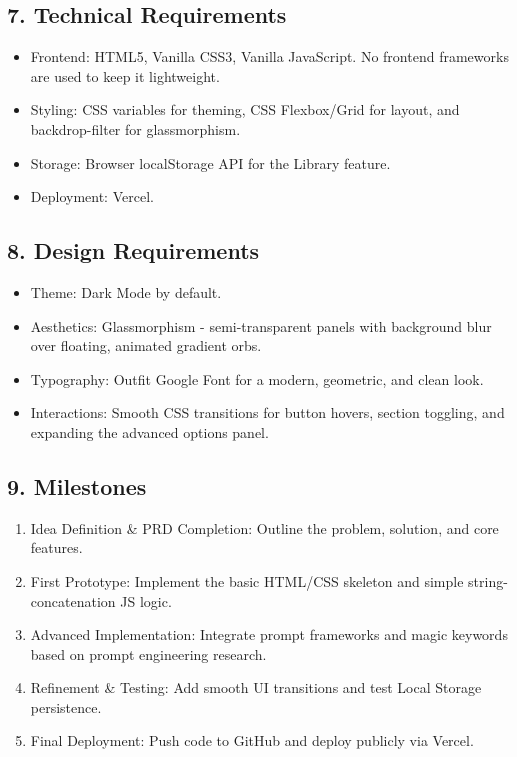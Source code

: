 \documentclass[11pt]{article}
\begin{document}
\subsection*{7. Technical Requirements}
\begin{itemize}[noitemsep]
    \item Frontend: HTML5, Vanilla CSS3, Vanilla JavaScript. No frontend frameworks are used to keep it lightweight.
    \item Styling: CSS variables for theming, CSS Flexbox/Grid for layout, and backdrop-filter for glassmorphism.
    \item Storage: Browser localStorage API for the Library feature.
    \item Deployment: Vercel.
\end{itemize}

\subsection*{8. Design Requirements}
\begin{itemize}[noitemsep]
    \item Theme: Dark Mode by default.
    \item Aesthetics: Glassmorphism - semi-transparent panels with background blur over floating, animated gradient orbs.
    \item Typography: Outfit Google Font for a modern, geometric, and clean look.
    \item Interactions: Smooth CSS transitions for button hovers, section toggling, and expanding the advanced options panel.
\end{itemize}

\subsection*{9. Milestones}
\begin{enumerate}[noitemsep]
    \item Idea Definition \& PRD Completion: Outline the problem, solution, and core features.
    \item First Prototype: Implement the basic HTML/CSS skeleton and simple string-concatenation JS logic.
    \item Advanced Implementation: Integrate prompt frameworks and magic keywords based on prompt engineering research.
    \item Refinement \& Testing: Add smooth UI transitions and test Local Storage persistence.
    \item Final Deployment: Push code to GitHub and deploy publicly via Vercel.
\end{enumerate}
\end{document}
